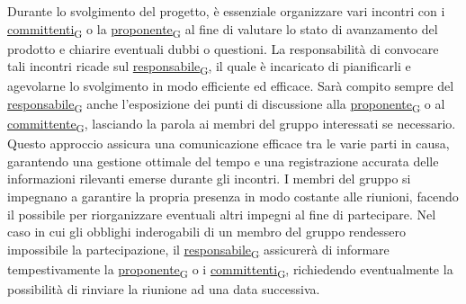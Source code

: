 Durante lo svolgimento del progetto, è essenziale organizzare vari incontri con i \href{https://7last.github.io/docs/pb/documentazione-interna/glossario\#committente}{committenti\textsubscript{G}} o la \href{https://7last.github.io/docs/pb/documentazione-interna/glossario\#proponente}{proponente\textsubscript{G}} al fine di valutare lo stato di avanzamento del prodotto e chiarire eventuali dubbi o questioni. La responsabilità di convocare tali incontri ricade sul \href{https://7last.github.io/docs/pb/documentazione-interna/glossario\#responsabile}{responsabile\textsubscript{G}}, il quale è incaricato di pianificarli e agevolarne lo svolgimento in modo efficiente ed efficace. Sarà compito sempre del \href{https://7last.github.io/docs/pb/documentazione-interna/glossario\#responsabile}{responsabile\textsubscript{G}} anche l’esposizione dei punti di discussione alla \href{https://7last.github.io/docs/pb/documentazione-interna/glossario\#proponente}{proponente\textsubscript{G}} o al \href{https://7last.github.io/docs/pb/documentazione-interna/glossario\#committente}{committente\textsubscript{G}}, lasciando la parola ai membri del gruppo interessati se necessario. Questo approccio assicura una comunicazione efficace tra le varie parti in causa, garantendo una gestione ottimale del tempo e una registrazione accurata delle informazioni rilevanti emerse durante gli incontri. I membri del gruppo si impegnano a garantire la propria presenza in modo costante alle riunioni, facendo il possibile per riorganizzare eventuali altri impegni al fine di partecipare. Nel caso in cui gli obblighi inderogabili di un membro del gruppo rendessero impossibile la partecipazione, il \href{https://7last.github.io/docs/pb/documentazione-interna/glossario\#responsabile}{responsabile\textsubscript{G}} assicurerà di informare tempestivamente la \href{https://7last.github.io/docs/pb/documentazione-interna/glossario\#proponente}{proponente\textsubscript{G}} o i \href{https://7last.github.io/docs/pb/documentazione-interna/glossario\#committente}{committenti\textsubscript{G}}, richiedendo eventualmente la possibilità di rinviare la riunione ad una data successiva.

